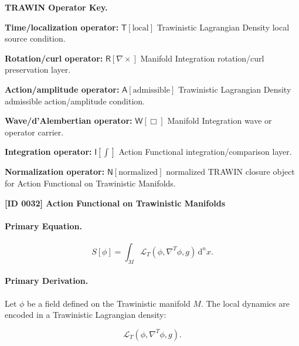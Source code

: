 \par\vspace{0.45\baselineskip}
\noindent\begin{minipage}[t]{\linewidth}
\begingroup
\small
\raggedright
\textbf{TRAWIN Operator Key.}\par
\noindent\textbf{Time/localization operator:} $\mathsf{T}\!\left[\mathrm{local}\right]$ Trawinistic Lagrangian Density local source condition.\par
\noindent\textbf{Rotation/curl operator:} $\mathsf{R}\!\left[\nabla\times\right]$ Manifold Integration rotation/curl preservation layer.\par
\noindent\textbf{Action/amplitude operator:} $\mathsf{A}\!\left[\mathrm{admissible}\right]$ Trawinistic Lagrangian Density admissible action/amplitude condition.\par
\noindent\textbf{Wave/d'Alembertian operator:} $\mathsf{W}\!\left[\Box\right]$ Manifold Integration wave or operator carrier.\par
\noindent\textbf{Integration operator:} $\mathsf{I}\!\left[\int\right]$ Action Functional integration/comparison layer.\par
\noindent\textbf{Normalization operator:} $\mathsf{N}\!\left[\mathrm{normalized}\right]$ normalized TRAWIN closure object for Action Functional on Trawinistic Manifolds.\par
\endgroup
\end{minipage}

\clearpage
\noindent\textbf{[ID 0032] Action Functional on Trawinistic Manifolds}\par
\vspace{0.35em}
\paragraph{Primary Equation.}
\begin{equation}
S[\phi]
=
\int_M
\mathcal{L}_T
\left(
\phi,\nabla^T\phi,g
\right)
\,\mathrm{d}^n x .
\end{equation}

\paragraph{Primary Derivation.}
Let $\phi$ be a field defined on the Trawinistic manifold $M$.  
The local dynamics are encoded in a Trawinistic Lagrangian density:

\begin{equation}
\mathcal{L}_T
\left(
\phi,\nabla^T\phi,g
\right).
\end{equation}

